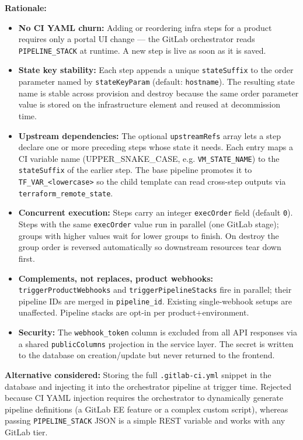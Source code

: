 \documentclass[12pt,a4paper,twoside]{report}
\newcommand{\code}[1]{\texttt{#1}}
\begin{document}
\textbf{Rationale:}
\begin{itemize}
  \item \textbf{No CI YAML churn:} Adding or reordering infra steps for a
        product requires only a portal UI change — the GitLab orchestrator
        reads \code{PIPELINE\_STACK} at runtime. A new step is live as
        soon as it is saved.
  \item \textbf{State key stability:} Each step appends a unique
        \code{stateSuffix} to the order parameter named by
        \code{stateKeyParam} (default: \code{hostname}). The resulting
        state name is stable across provision and destroy because the same
        order parameter value is stored on the infrastructure element and
        reused at decommission time.
  \item \textbf{Upstream dependencies:} The optional
        \code{upstreamRefs} array lets a step declare one or more
        preceding steps whose state it needs. Each entry maps a CI
        variable name (UPPER\_SNAKE\_CASE, e.g. \code{VM\_STATE\_NAME})
        to the \code{stateSuffix} of the earlier step. The base pipeline
        promotes it to \code{TF\_VAR\_<lowercase>} so the child
        template can read cross-step outputs via
        \code{terraform\_remote\_state}.
  \item \textbf{Concurrent execution:} Steps carry an integer
        \code{execOrder} field (default \code{0}). Steps with the same
        \code{execOrder} value run in parallel (one GitLab stage);
        groups with higher values wait for lower groups to finish. On
        destroy the group order is reversed automatically so downstream
        resources tear down first.
  \item \textbf{Complements, not replaces, product webhooks:}
        \code{triggerProductWebhooks} and \code{triggerPipelineStacks}
        fire in parallel; their pipeline IDs are merged in
        \code{pipeline\_id}. Existing single-webhook setups are
        unaffected. Pipeline stacks are opt-in per product+environment.
  \item \textbf{Security:} The \code{webhook\_token} column is excluded
        from all API responses via a shared \code{publicColumns} projection
        in the service layer. The secret is written to the database on
        creation/update but never returned to the frontend.
\end{itemize}

\textbf{Alternative considered:} Storing the full \texttt{.gitlab-ci.yml}
snippet in the database and injecting it into the orchestrator pipeline at
trigger time. Rejected because CI YAML injection requires the orchestrator
to dynamically generate pipeline definitions (a GitLab EE feature or a
complex custom script), whereas passing \code{PIPELINE\_STACK} JSON is a
simple REST variable and works with any GitLab tier.
\end{document}
